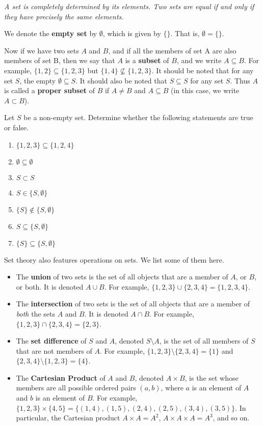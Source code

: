 \textit{A set is completely determined by its elements. Two sets are equal if and only if they have precisely the same elements}.

We denote the \textbf{empty set} by $\emptyset$, which is given by $\{\}$. That is, $\emptyset = \{\}$.

Now if we have two sets $A$ and $B$, and if all the members of set A are also members of set B, then we say that $A$ is a \textbf{subset} of $B$, and we write $A \subseteq B$. For example, $\{1, 2\} \subseteq \{1, 2, 3\}$ but $\{1, 4\} \not\subseteq \{1, 2, 3\}$. It should be noted that for any set $S$, the empty $\emptyset \subseteq S$. It should also be noted that $S \subseteq S$ for any set $S$. Thus $A$ is called a \textbf{proper subset} of $B$ if $A \neq B$ and $A \subseteq B$ (in this case, we write $A \subset B$).

\begin{exercise}
    Let $S$ be a non-empty set. Determine whether the following statements are true or false.
    \begin{enumerate}[label=(\alph*)]
        \item $\{1, 2, 3\} \subseteq \{1, 2, 4\}$
        \item $\emptyset \subseteq \emptyset$
        \item $S \subset S$
        \item $S \in \{S, \emptyset\}$
        \item $\{S\} \notin \{S, \emptyset\}$
        \item $S \subseteq \{S, \emptyset\}$
        \item $\{S\} \subseteq \{S, \emptyset\}$
    \end{enumerate}
\end{exercise}

Set theory also features operations on sets. We list some of them here.
\begin{itemize}
    \item The \textbf{union} of two sets is the set of all objects that are a member of $A$, or $B$, or both. It is denoted $A \cup B$. For example, $\{1, 2, 3\} \cup \{2, 3, 4\} = \{1, 2, 3, 4\}$.
    \item The \textbf{intersection} of two sets is the set of all objects that are a member of \textit{both} the sets $A$ and $B$. It is denoted $A \cap B$. For example, $\{1, 2, 3\} \cap \{2, 3, 4\} = \{2, 3\}$.
    \item The \textbf{set difference} of $S$ and $A$, denoted $S \setminus A$, is the set of all members of $S$ that are not members of $A$. For example, $\{1, 2, 3\} \setminus \{2, 3, 4\} = \{1\}$ and $\{2, 3, 4\} \setminus \{1, 2, 3\} = \{4\}$.
    \item The \textbf{Cartesian Product} of $A$ and $B$, denoted $A \times B$, is the set whose members are all possible ordered pairs $(a, b)$, where $a$ is an element of $A$ and $b$ is an element of $B$. For example, $\{1, 2, 3\} \times \{4, 5\} = \{(1, 4), (1, 5), (2, 4), (2, 5), (3, 4), (3, 5)\}$. In particular, the Cartesian product $A \times A = A^2$, $A\times A \times A = A^3$, and so on.
\end{itemize}

